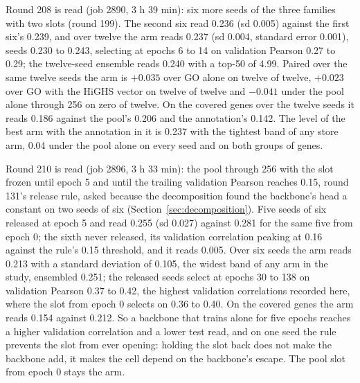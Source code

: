 Round 208 is read (job 2890, 3 h 39 min): six more seeds of the three families with
two slots (round 199). The second six read 0.236 (sd 0.005) against the first six's
0.239, and over twelve the arm reads 0.237 (sd 0.004, standard error 0.001), seeds
0.230 to 0.243, selecting at epochs 6 to 14 on validation Pearson 0.27 to 0.29; the
twelve-seed ensemble reads 0.240 with a top-50 of 4.99. Paired over the same twelve
seeds the arm is $+0.035$ over GO alone on twelve of twelve, $+0.023$ over GO with the
HiGHS vector on twelve of twelve and $-0.041$ under the pool alone through 256 on zero
of twelve. On the covered genes over the twelve seeds it reads 0.186 against the
pool's 0.206 and the annotation's 0.142. The level of the best arm with the annotation
in it is 0.237 with the tightest band of any store arm, 0.04 under the pool alone on
every seed and on both groups of genes.

Round 210 is read (job 2896, 3 h 33 min): the pool through 256 with the slot frozen
until epoch 5 and until the trailing validation Pearson reaches 0.15, round 131's
release rule, asked because the decomposition found the backbone's head a constant on
two seeds of six (Section~\ref{sec:decomposition}). Five seeds of six released at
epoch 5 and read 0.255 (sd 0.027) against 0.281 for the same five from epoch 0; the
sixth never released, its validation correlation peaking at 0.16 against the rule's
0.15 threshold, and it reads 0.005. Over six seeds the arm reads 0.213 with a standard
deviation of 0.105, the widest band of any arm in the study, ensembled 0.251; the
released seeds select at epochs 30 to 138 on validation Pearson 0.37 to 0.42, the
highest validation correlations recorded here, where the slot from epoch 0 selects on
0.36 to 0.40. On the covered genes the arm reads 0.154 against 0.212. So a backbone
that trains alone for five epochs reaches a higher validation correlation and a lower
test read, and on one seed the rule prevents the slot from ever opening: holding the
slot back does not make the backbone add, it makes the cell depend on the backbone's
escape. The pool slot from epoch 0 stays the arm.

